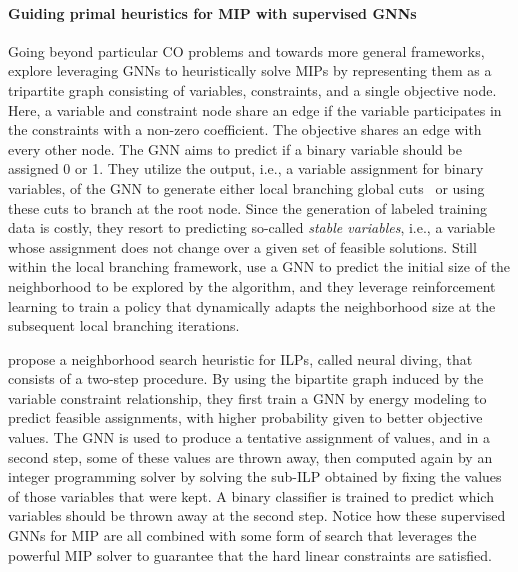 \documentclass[twoside,11pt]{article}
\begin{document}
\paragraph{Guiding primal heuristics for MIP with supervised GNNs}
Going beyond particular CO problems and towards more general frameworks, \citet{Ding2019} explore leveraging GNNs to heuristically solve MIPs by representing them as a tripartite graph consisting of variables, constraints, and a single objective node.  Here, a variable and constraint node share an edge if the variable participates in the constraints with a non-zero coefficient. The objective shares an edge with every other node. The GNN aims to predict if a binary variable should be assigned 0 or 1. They utilize the output, i.e., a variable assignment for binary variables, of the GNN to generate either local branching global cuts~\citep{Fis+2003} or using these cuts to branch at the root node. Since the generation of labeled training data is costly, they resort to predicting so-called \emph{stable variables}, i.e., a variable whose assignment does not change over a given set of feasible solutions. Still within the local branching framework, \cite{Liu_Fischetti_Lodi_2022} use a GNN to predict the initial size of the neighborhood to be explored by the algorithm, and they leverage reinforcement learning to train a policy that dynamically adapts the neighborhood size at the subsequent local branching iterations. 

\citet{nair2020solving} propose a neighborhood search heuristic for ILPs, called neural diving, that consists of a two-step procedure. By using the bipartite graph induced by the variable constraint relationship, they first train a GNN by energy modeling to predict feasible assignments, with higher probability given to better objective values. The GNN is used to produce a tentative assignment of values, and in a second step, some of these values are thrown away, then computed again by an integer programming solver by solving the sub-ILP obtained by fixing the values of those variables that were kept. A binary classifier is trained to predict which variables should be thrown away at the second step. Notice how these supervised GNNs for MIP are all combined with some form of search that leverages the powerful MIP solver to guarantee that the hard linear constraints are satisfied.
\end{document}
